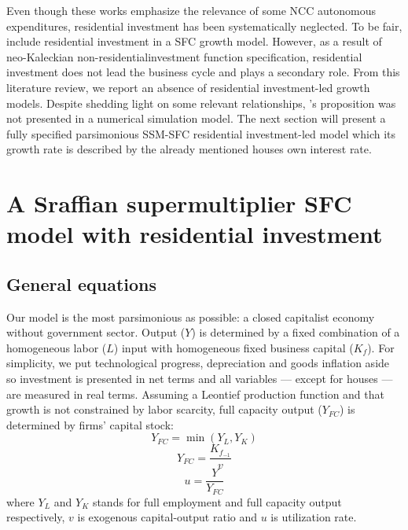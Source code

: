 \documentclass[11pt]{article}
\begin{document}
Even though these works emphasize the relevance of some NCC autonomous expenditures, residential investment has been systematically neglected.
To be fair, \textcites{zezza_u.s._2008}{nikolaidi_securitisation_2015} include residential investment in a SFC growth model.
However, as a result of neo-Kaleckian non-residentialinvestment function specification, residential investment does not lead the business cycle and plays a secondary role.
From this literature review, we report an absence of residential investment-led growth models. 
Despite shedding light on some relevant relationships, \citeauthor*{teixeira_crescimento_2015}'s \citeyear{teixeira_crescimento_2015} proposition was not presented in a numerical simulation model.
The next section will present a fully specified parsimonious SSM-SFC residential investment-led model 
which its growth rate is described by the already mentioned houses own interest rate.


\section{A Sraffian supermultiplier SFC model with residential investment}
\label{sec:orgadd806b}
\label{sec:Model}
\subsection{General equations}
\label{sec:orgdcd9c2c}

Our model is the most parsimonious as possible: a closed capitalist economy without government sector. Output (\(Y\)) is determined by  a fixed combination of a homogeneous labor (\(L\)) input with homogeneous fixed business capital (\(K_f\)). 
For simplicity, we put technological progress, depreciation and goods inflation aside so investment is presented in net terms and all variables --- except for houses --- are measured in real terms.
Assuming a Leontief production function and that growth is not constrained by labor scarcity, full capacity output (\(Y_{FC}\)) is
determined by firms' capital stock:
\begin{equation}
\label{_Leontieff}
    Y_{FC} = \min (Y_L, Y_K)
\end{equation}
\begin{equation}
\label{_YFC}
    Y_{FC} = \frac{K_{f_{-1}}}{v}
\end{equation}
\begin{equation}
\label{_u}
    u = \frac{Y}{Y_{FC}}
\end{equation}
where \(Y_L\) and \(Y_K\) stands for full employment and full capacity output respectively, \(v\) is exogenous capital-output ratio and \(u\) is utilization rate.
\end{document}
